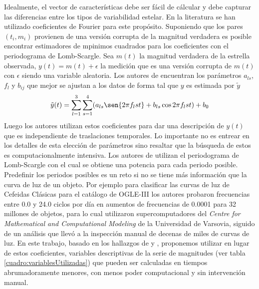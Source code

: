 \documentclass[letterpaper,12pt]{book}
\begin{document}
Idealmente, el vector de características debe ser fácil de cálcular y debe capturar las diferencias entre los tipos de variabilidad estelar. En la literatura \cite{debosscher_automated_2007, sarro_automated_2009, richards_machine-learned_2011} se han utilizado coeficientes de Fourier para este propósito. Suponiendo que los pares $(t_i,m_i)$ provienen de una versión corrupta  de la magnitud verdadera es posible encontrar estimadores de mpinimos cuadrados para los coeficientes con el periodograma de Lomb-Scargle. Sea $m(t)$ la magnitud verdadera de la estrella observada, $y(t) = m(t)+\epsilon$ la medición que es una versión corrupta de $m(t)$ con $\epsilon$ siendo una variable aleatoria. Los autores de \cite{debosscher_automated_2007} encuentran los parámetros $a_{ls}$, $f_l$ y $b_{ij}$ que mejor se ajustan a los datos de forma tal que $y$ es estimada por $\tilde{y}$
\begin{equation*}
\tilde{y}(t)=\sum_{l=1}^{3}\sum_{s=1}^{4}(a_{ls}\sen{2\pi f_l st} + b_{ls}\cos{2\pi f_l st}) + b_0
\end{equation*} 
Luego los autores utilizan estos coeficientes para dar una descripción de $y(t)$ que es independiente de traslaciones temporales. Lo importante no es entrear en los detalles de esta elección de parámetros sino resaltar que la búsqueda de estos es computacionalmente intensiva. Los autores de \cite{debosscher_automated_2007} utilizan el periodograma de Lomb-Scargle \cite{scargle_studies_1982} con el cual se obtiene una potencia para cada periodo posible. Predefinir los periodos posibles es un reto si no se tiene más información que la curva de luz de un objeto. Por ejemplo para clasificar las curvas de luz de Cefeidas Clásicas para el catálogo de OGLE-III \cite{soszynski_optical_2008-1} los autores probaron frecuencias entre 0.0 y 24.0 ciclos por día en aumentos de frecuencias de 0.0001 para 32 millones de objetos, para lo cual utilizaron supercomputadores del  \textit{Centre for Mathematical and Computational Modeling} de la Universidad de Varsovia, siguido de un análisis que llevó a la inspección manual de decenas de miles de curvas de luz. En este trabajo, basado en los hallazgos de \cite{rodriguez_feliciano_alisis_2012} y \cite{sabogal_search_2014}, proponemos utilizar en lugar de estos coeficientes, variables descriptivas de la serie de magnitudes (ver tabla \ref{cuadro:variablesUtilizadas}) que pueden ser calculadas en tiempos abrumadoramente menores, con menos poder computacional y sin intervención manual.
\end{document}
